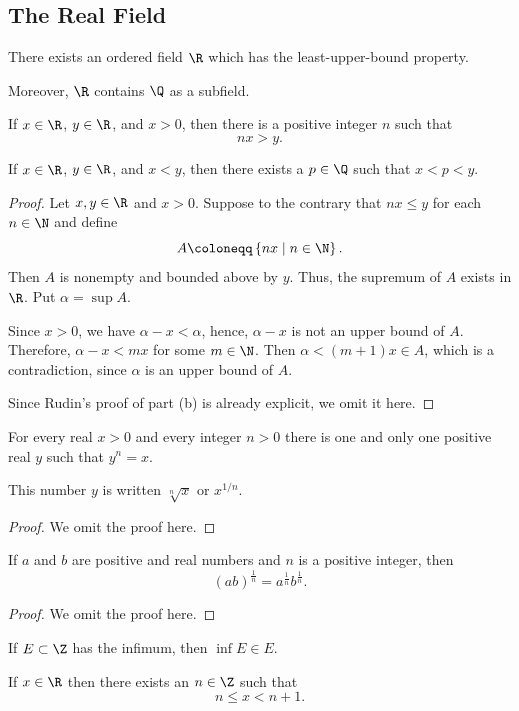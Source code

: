 \subsection{The Real Field}
\begin{theorem}
There exists an ordered field $\R$ which has the least-upper-bound property.

Moreover, $\R$ contains $\Q$ as a subfield.
\end{theorem}

\begin{theorem}
    \item[(a)] If $x \in \R$, $y \in \R$, and $x>0$, then there is a positive integer $n$ such that \[nx>y.\]
    \item[(b)] If $x \in \R$, $y \in \R$, and $x<y$, then there exists a $p \in \Q$ such that $x<p<y$.
\end{theorem}
\begin{proof}
\item[(a)] 
Let $x,y \in \R$ and $x>0$. 
Suppose to the contrary that $nx \leq y$ for each $n \in \N$ and define \[A \coloneqq \left\{nx \mid n \in \N \right\}.\] 
Then $A$ is nonempty and bounded above by $y$. 
Thus, the supremum of $A$ exists in $\R$. Put $\alpha = \sup A$.

Since $x>0$, we have $\alpha - x < \alpha$, hence, $\alpha-x$ is not an upper bound of $A$. Therefore, $\alpha-x<mx$ for some $m \in \N$. 
Then $\alpha < (m+1)x \in A$, which is a contradiction, since $\alpha$ is an upper bound of $A$.
\item[(b)]
Since Rudin's proof of part (b) is already explicit, we omit it here.
\end{proof}
\begin{theorem}\label{thm:nth_square_root}
For every real $x>0$ and every integer $n>0$ there is one and only one positive real $y$ such that $y^n=x$.
\end{theorem}
This number $y$ is written $\sqrt[n]{x}$ or $x^{1/n}$. 
\begin{proof}
We omit the proof here.
\end{proof}
\begin{corollary}\label{thm:associative_nth_sqrt}
If $a$ and $b$ are positive and real numbers and $n$ is a positive integer, then 
\[
(ab)^{\frac{1}{n}}=a^{\frac{1}{n}}b^{\frac{1}{n}}.
\]
\end{corollary}
\begin{proof}
We omit the proof here.
\end{proof}
\begin{lemma}\label{greatest integer}
\item[(a)] If $E \subset \Z$ has the infimum, then $\inf E \in E$.
\item[(b)] If $x \in \R$ then there exists an $n \in \Z$ such that \[n \leq x < n+1.\]
\end{lemma}
